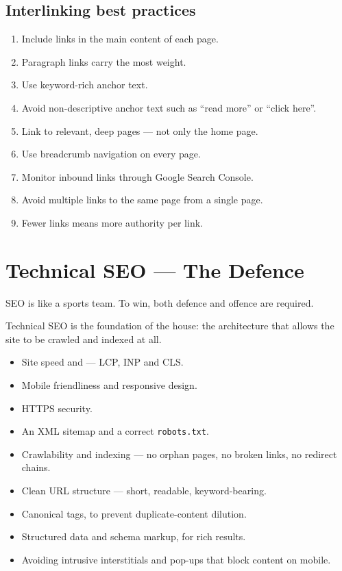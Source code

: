 \subsection{Interlinking best practices}

\begin{enumerate}
\item Include links in the main content of each page.
\item Paragraph links carry the most weight.
\item Use keyword-rich anchor text.
\item Avoid non-descriptive anchor text such as ``read more'' or ``click here''.
\item Link to relevant, deep pages --- not only the home page.
\item Use breadcrumb navigation on every page.
\item Monitor inbound links through Google Search Console.
\item Avoid multiple links to the same page from a single page.
\item Fewer links means more authority per link.
\end{enumerate}

\section{Technical SEO --- The Defence}

\begin{quotebox}
SEO is like a sports team. To win, both defence and offence are required.
\end{quotebox}

Technical SEO is the foundation of the house: the architecture that allows the
site to be crawled and indexed at all.

\begin{itemize}
\item Site speed and  --- LCP, INP and CLS.
\item Mobile friendliness and responsive design.
\item HTTPS security.
\item An XML sitemap and a correct \texttt{robots.txt}.
\item Crawlability and indexing --- no orphan pages, no broken links, no
      redirect chains.
\item Clean URL structure --- short, readable, keyword-bearing.
\item Canonical tags, to prevent duplicate-content dilution.
\item Structured data and schema markup, for rich results.
\item Avoiding intrusive interstitials and pop-ups that block content on mobile.
\end{itemize}

